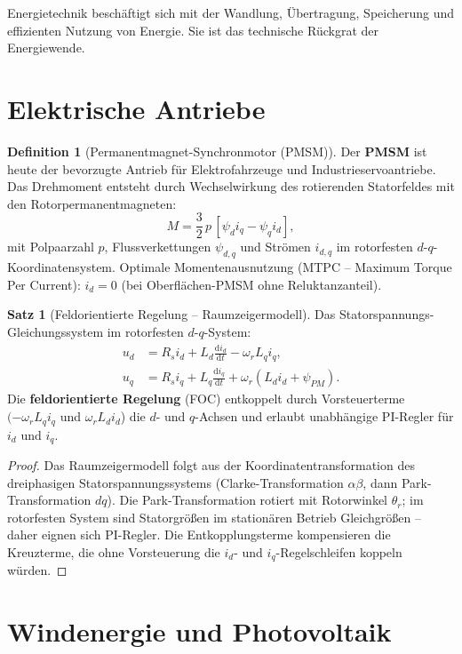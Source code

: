﻿\documentclass[a4paper,12pt]{report}
\theoremstyle{definition}
\newtheorem{definition}{Definition}
\newtheorem{satz}{Satz}
\begin{document}
Energietechnik beschäftigt sich mit der Wandlung, Übertragung,
Speicherung und effizienten Nutzung von Energie. Sie ist das
technische Rückgrat der Energiewende.

\section{Elektrische Antriebe}

\begin{definition}[Permanentmagnet-Synchronmotor (PMSM)]
Der \textbf{PMSM} ist heute der bevorzugte Antrieb für Elektrofahrzeuge
und Industrieservoantriebe. Das Drehmoment entsteht durch Wechselwirkung
des rotierenden Statorfeldes mit den Rotorpermanentmagneten:
\[
  M = \frac{3}{2}\,p\,[\psi_d i_q - \psi_q i_d],
\]
mit Polpaarzahl $p$, Flussverkettungen $\psi_{d,q}$ und Strömen $i_{d,q}$
im rotorfesten $d$-$q$-Koordinatensystem.
Optimale Momentenausnutzung (MTPC -- Maximum Torque Per Current):
$i_d = 0$ (bei Oberflächen-PMSM ohne Reluktanzanteil).
\end{definition}

\begin{satz}[Feldorientierte Regelung -- Raumzeigermodell]
Das Statorspannungs-Gleichungssystem im rotorfesten $d$-$q$-System:
\begin{align*}
  u_d &= R_s i_d + L_d \frac{\mathrm{d}i_d}{\mathrm{d}t} - \omega_r L_q i_q, \\
  u_q &= R_s i_q + L_q \frac{\mathrm{d}i_q}{\mathrm{d}t} + \omega_r (L_d i_d + \psi_{PM}).
\end{align*}
Die \textbf{feldorientierte Regelung} (FOC) entkoppelt durch
Vorsteuerterme $(-\omega_r L_q i_q$ und $\omega_r L_d i_d$) die
$d$- und $q$-Achsen und erlaubt unabhängige PI-Regler für $i_d$ und $i_q$.
\end{satz}
\begin{proof}
Das Raumzeigermodell folgt aus der Koordinatentransformation des
dreiphasigen Statorspannungssystems (Clarke-Transformation $\alpha\beta$,
dann Park-Transformation $dq$). Die Park-Transformation rotiert
mit Rotorwinkel $\theta_r$; im rotorfesten System sind Statorgrößen
im stationären Betrieb Gleichgrößen -- daher eignen sich PI-Regler.
Die Entkopplungsterme kompensieren die Kreuzterme, die ohne Vorsteuerung
die $i_d$- und $i_q$-Regelschleifen koppeln würden.
\end{proof}

\section{Windenergie und Photovoltaik}
\end{document}
